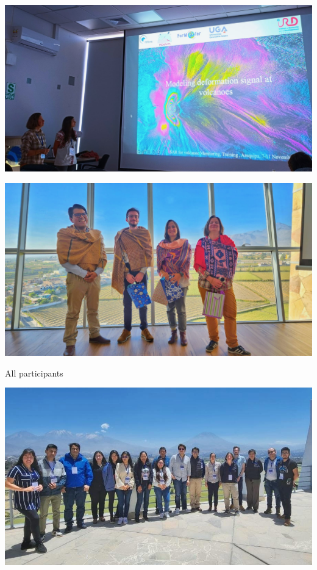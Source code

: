 \documentclass{beamer}
\begin{document}
\begin{frame}
 
 \includegraphics[width=1\linewidth]{images/CoursVirginieLéa.jpeg}
 
\end{frame}


\begin{frame}
 
 \includegraphics[width=1\linewidth]{images/KdoIGPGroupeBest.jpeg}
 
\end{frame}


\begin{frame}

 {All participants}
 
 \includegraphics[width=1\linewidth]{images/GroupeTotalTerrasse.jpeg}
 
\end{frame}
\end{document}
